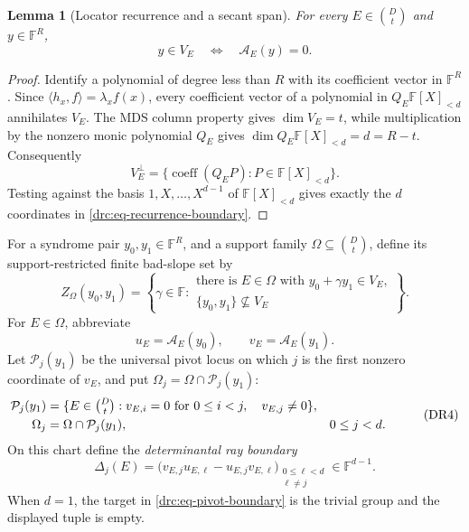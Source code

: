 \documentclass[11pt,a4paper]{amsart}
\numberwithin{equation}{section}
\newtheorem{lemma}[lemma]{Lemma}
\theoremstyle{remark}
\newcommand{\F}{\mathbb F}
\begin{document}
\begin{lemma}[Locator recurrence and a secant span]
\label{drc:lem-locator-recurrence}
For every \(E\in\binom Dt\) and \(y\in\F^R\),
\[
                         y\in V_E
             \quad\Longleftrightarrow\quad
                         \mathcal A_E(y)=0.
             \tag{DR2}\label{drc:eq-recurrence-membership}
\]
\end{lemma}

\begin{proof}
Identify a polynomial of degree less than \(R\) with its coefficient
vector in \(\F^R\).  Since
\(
 \langle h_x,f\rangle=\lambda_xf(x)
\), every coefficient vector of a polynomial in
\(Q_E\F[X]_{<d}\) annihilates \(V_E\).  The MDS column property gives
\(\dim V_E=t\), while multiplication by the nonzero monic polynomial
\(Q_E\) gives
\(\dim Q_E\F[X]_{<d}=d=R-t\).  Consequently
\[
 V_E^\perp=
 \{\operatorname{coeff}(Q_EP):P\in\F[X]_{<d}\}.
\]
Testing against the basis \(1,X,\ldots,X^{d-1}\) of
\(\F[X]_{<d}\) gives exactly the \(d\) coordinates in
\eqref{drc:eq-recurrence-boundary}.
\end{proof}

For a syndrome pair \(y_0,y_1\in\F^R\), and a support family
\(\Omega\subseteq\binom Dt\), define its support-restricted finite bad-slope
set by
\[
 Z_\Omega(y_0,y_1)=
 \left\{\gamma\in\F:\begin{array}{l}
   \text{there is \(E\in\Omega\) with }
       y_0+\gamma y_1\in V_E,\\[-1mm]
   \{y_0,y_1\}\not\subseteq V_E
 \end{array}\right\}.
 \tag{DR3}\label{drc:eq-restricted-rays}
\]
For \(E\in\Omega\), abbreviate
\[
              u_E=\mathcal A_E(y_0),\qquad
              v_E=\mathcal A_E(y_1).
\]
Let \(\mathcal P_j(y_1)\) be the universal pivot locus on which \(j\) is
the first nonzero coordinate of \(v_E\), and put
\(\Omega_j=\Omega\cap\mathcal P_j(y_1)\):
\[
 \begin{aligned}
 \mathcal P_j(y_1)
   &=\{E\in\tbinom Dt:
          v_{E,i}=0\ \text{for }0\le i<j,\quad v_{E,j}\ne0\},\\
 \Omega_j&=\Omega\cap\mathcal P_j(y_1),
       &&0\le j<d.
 \end{aligned}
 \tag{DR4}\label{drc:eq-pivot-chart}
\]
On this chart define the \emph{determinantal ray boundary}
\[
 \Delta_j(E)=
 \bigl(v_{E,j}u_{E,\ell}-u_{E,j}v_{E,\ell}\bigr)_
       {\substack{0\le\ell<d\\ \ell\ne j}}
 \in\F^{d-1}.
 \tag{DR5}\label{drc:eq-pivot-boundary}
\]
When \(d=1\), the target in \eqref{drc:eq-pivot-boundary} is the trivial
group and the displayed tuple is empty.
\end{document}
